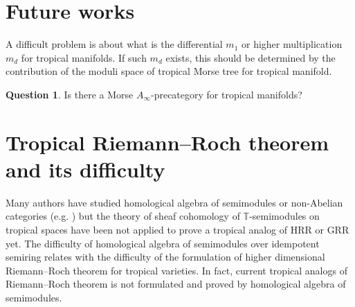 \documentclass[a4paper,dvipdfmx,reqno,12pt]{amsart}
\theoremstyle{definition}
\newtheorem{question}[theorem]{Question}
\numberwithin{equation}{section}
\begin{document}
\section{Future works}

A difficult problem is about what is the differential $m_1$ or higher multiplication $m_d$ for tropical manifolds.
If such $m_d$ exists, this should be determined by the contribution of the moduli space of tropical Morse tree for tropical manifold.
\begin{question}
  Is there a Morse $A_{\infty}$-precategory for tropical manifolds?
\end{question}







\appendix

\section{Tropical Riemann--Roch theorem and 
its difficulty}
\label{section-tropical-riemann-roch}

Many authors have studied homological algebra of semimodules 
or non-Abelian categories (e.g. 
\cite{MR3051517,MR3211743,MR3939048,https://doi.org/10.48550/arxiv.2202.01573})
but the theory of sheaf cohomology of 
$\mathbb{T}$-semimodules on tropical spaces 
have been not applied to prove a tropical
analog of HRR or GRR yet.
The difficulty of homological algebra of semimodules
over idempotent semiring relates 
with the difficulty of the formulation of
higher dimensional
Riemann--Roch theorem for tropical varieties.
In fact, current tropical analogs of Riemann--Roch 
theorem is not formulated and proved by 
homological algebra of semimodules.
\end{document}
